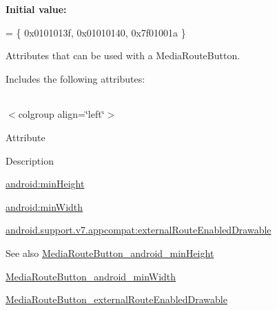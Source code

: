 {\bfseries Initial value\+:}
\begin{DoxyCode}
= \{
            0x0101013f, 0x01010140, 0x7f01001a
        \}
\end{DoxyCode}
Attributes that can be used with a Media\+Route\+Button. 

Includes the following attributes\+:

\tabulinesep=1mm
\begin{longtabu} spread 0pt [c]{*{0}{|X[-1]}|}
\hline
\end{longtabu}
$<$colgroup align=\char`\"{}left\char`\"{}$>$ 

Attribute

Description 

{\ttfamily \hyperlink{classandroid_1_1support_1_1v7_1_1appcompat_1_1R_1_1styleable_a2564893a3074e757d9f11b2d0ca47cff}{android\+:min\+Height}}

{\ttfamily \hyperlink{classandroid_1_1support_1_1v7_1_1appcompat_1_1R_1_1styleable_a0400293e3b28056d7067951efabf7d4b}{android\+:min\+Width}}

{\ttfamily \hyperlink{classandroid_1_1support_1_1v7_1_1appcompat_1_1R_1_1styleable_a1f1a3ab5cdb8df22806a959c7196f96f}{android.\+support.\+v7.\+appcompat\+:external\+Route\+Enabled\+Drawable}}

\begin{DoxySeeAlso}{See also}
\hyperlink{classandroid_1_1support_1_1v7_1_1appcompat_1_1R_1_1styleable_a2564893a3074e757d9f11b2d0ca47cff}{Media\+Route\+Button\+\_\+android\+\_\+min\+Height} 

\hyperlink{classandroid_1_1support_1_1v7_1_1appcompat_1_1R_1_1styleable_a0400293e3b28056d7067951efabf7d4b}{Media\+Route\+Button\+\_\+android\+\_\+min\+Width} 

\hyperlink{classandroid_1_1support_1_1v7_1_1appcompat_1_1R_1_1styleable_a1f1a3ab5cdb8df22806a959c7196f96f}{Media\+Route\+Button\+\_\+external\+Route\+Enabled\+Drawable} 
\end{DoxySeeAlso}
\mbox{\label{classandroid_1_1support_1_1v7_1_1appcompat_1_1R_1_1styleable_a2564893a3074e757d9f11b2d0ca47cff}} 
